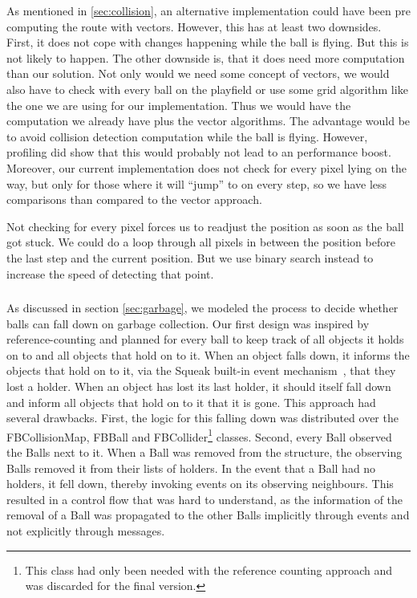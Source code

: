 As mentioned in \ref{sec:collision}, an alternative implementation could have been pre computing the route
with vectors. However, this has at least two downsides. First, it does not cope with changes happening
while the ball is flying. But this is not likely to happen. The other downside is, that it does need more
computation than our solution. Not only would we need some concept of vectors, we would also have to check
with every ball on the playfield or use some grid algorithm like the one we are using for our implementation.
Thus we would have the computation we already have plus the vector algorithms. The advantage would be to avoid
collision detection computation while the ball is flying. However, profiling did show that this would probably
not lead to an performance boost. Moreover, our current implementation does not check for every pixel lying
on the way, but only for those where it will ``jump'' to on every step, so we have less comparisons than compared
to the vector approach.

Not checking for every pixel forces us to readjust the position as soon as the ball got stuck. We could do a loop
through all pixels in between the position before the last step and the current position. But we use binary search
instead to increase the speed of detecting that point.
%
\subsubsection{}
As discussed in section \ref{sec:garbage}, we modeled the process to decide whether balls can fall down on garbage collection. Our first design was inspired by reference-counting and planned for every ball to keep track of all objects it holds on to and all objects that hold on to it. When an object falls down, it informs the objects that hold on to it, via the Squeak built-in event mechanism~\cite{website:squeakwikiObserver}, that they lost a holder. When an object has lost its last holder, it should itself fall down and inform all objects that hold on to it that it is gone.
This approach had several drawbacks. First, the logic for this falling down was distributed over the FBCollisionMap, FBBall and FBCollider\footnote{This class had only been needed with the reference counting approach and was discarded for the final version.} classes.
Second, every Ball observed the Balls next to it. When a Ball was removed from the structure, the observing Balls removed it from their lists of holders. In the event that a Ball had no holders, it fell down, thereby invoking events on its observing neighbours.
This resulted in a control flow that was hard to understand, as the information of the removal of a Ball was propagated to the other Balls implicitly through events and not explicitly through messages.

